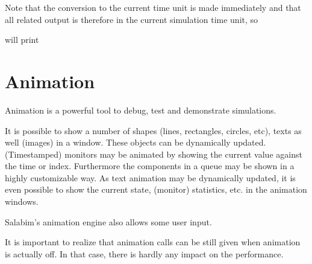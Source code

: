 \documentclass[letterpaper,10pt,english]{sphinxmanual}
\begin{document}
Note that the conversion to the current time unit is made immediately and that all related output
is therefore in the current simulation time unit, so

\begin{sphinxVerbatim}[commandchars=\\\{\}]
\end{sphinxVerbatim}

will print

\begin{sphinxVerbatim}[commandchars=\\\{\}]
  
  
\end{sphinxVerbatim}


\chapter{Animation}
\label{\detokenize{Animation:animation}}\label{\detokenize{Animation::doc}}
Animation is a powerful tool to debug, test and demonstrate simulations.

It is possible to show a number of shapes (lines, rectangles, circles, etc), texts as well (images) in a window. These objects can be dynamically updated.
(Timestamped) monitors may be animated by showing the current value against the time or index.
Furthermore the components in a queue may be shown in a highly customizable way.
As text animation may be dynamically updated, it is even possible to show the current state, (monitor) statistics, etc. in the animation windows.

Salabim’s animation engine also allows some user input.

It is important to realize that animation calls can be still given when animation is actually off. In that case, there is hardly any impact on the performance.
\end{document}

